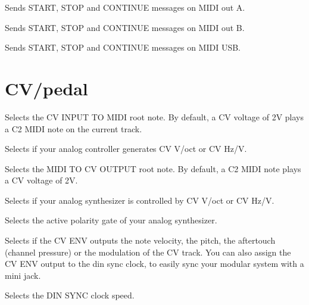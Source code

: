   

Sends START, STOP and CONTINUE messages on MIDI out A.

  

Sends START, STOP and CONTINUE messages on MIDI out B.

  

Sends START, STOP and CONTINUE messages on MIDI USB.


\section{CV/pedal}

   

Selects the CV INPUT TO MIDI root note. By default, a CV voltage of 2V plays a C2 MIDI note on the current track.

  

Selects if your analog controller generates CV V/oct or CV Hz/V.

   

Selects the MIDI TO CV OUTPUT root note. By default, a C2 MIDI note plays a CV voltage of 2V.

  

Selects if your analog synthesizer is controlled by CV V/oct or CV Hz/V.

  

Selects the active polarity gate of your analog synthesizer.

     

Selects if the CV ENV outputs the note velocity, the pitch, the aftertouch (channel pressure) or the modulation of the CV track. You can also assign the CV ENV output to the din sync clock, to easily sync your modular system with a mini jack.

          

Selects the DIN SYNC clock speed.

  


